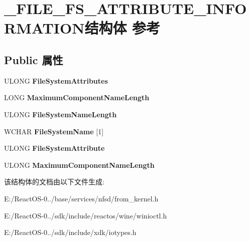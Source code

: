 \hypertarget{struct___f_i_l_e___f_s___a_t_t_r_i_b_u_t_e___i_n_f_o_r_m_a_t_i_o_n}{}\section{\+\_\+\+F\+I\+L\+E\+\_\+\+F\+S\+\_\+\+A\+T\+T\+R\+I\+B\+U\+T\+E\+\_\+\+I\+N\+F\+O\+R\+M\+A\+T\+I\+O\+N结构体 参考}
\label{struct___f_i_l_e___f_s___a_t_t_r_i_b_u_t_e___i_n_f_o_r_m_a_t_i_o_n}
\subsection*{Public 属性}
\begin{DoxyCompactItemize}
\item 
\mbox{\label{struct___f_i_l_e___f_s___a_t_t_r_i_b_u_t_e___i_n_f_o_r_m_a_t_i_o_n_a65e3219270d77ad5fa66ad0c03287800}} 
U\+L\+O\+NG {\bfseries File\+System\+Attributes}
\item 
\mbox{\label{struct___f_i_l_e___f_s___a_t_t_r_i_b_u_t_e___i_n_f_o_r_m_a_t_i_o_n_acaedbe8a0ba5fd34fd95955620f08716}} 
L\+O\+NG {\bfseries Maximum\+Component\+Name\+Length}
\item 
\mbox{\label{struct___f_i_l_e___f_s___a_t_t_r_i_b_u_t_e___i_n_f_o_r_m_a_t_i_o_n_a7f3cbfb7319eea246cdbed9174ceb298}} 
U\+L\+O\+NG {\bfseries File\+System\+Name\+Length}
\item 
\mbox{\label{struct___f_i_l_e___f_s___a_t_t_r_i_b_u_t_e___i_n_f_o_r_m_a_t_i_o_n_ac519495ef918b4e1bf71f4fbd1cc07b1}} 
W\+C\+H\+AR {\bfseries File\+System\+Name} \mbox{[}1\mbox{]}
\item 
\mbox{\label{struct___f_i_l_e___f_s___a_t_t_r_i_b_u_t_e___i_n_f_o_r_m_a_t_i_o_n_ab3726c62e2dfe7ab488faeda61eb230e}} 
U\+L\+O\+NG {\bfseries File\+System\+Attribute}
\item 
\mbox{\label{struct___f_i_l_e___f_s___a_t_t_r_i_b_u_t_e___i_n_f_o_r_m_a_t_i_o_n_a8609b1de1b8fc08773ad029825ad4272}} 
U\+L\+O\+NG {\bfseries Maximum\+Component\+Name\+Length}
\end{DoxyCompactItemize}


该结构体的文档由以下文件生成\+:\begin{DoxyCompactItemize}
\item 
E\+:/\+React\+O\+S-\/0../base/services/nfsd/from\+\_\+kernel.\+h\item 
E\+:/\+React\+O\+S-\/0../sdk/include/reactos/wine/winioctl.\+h\item 
E\+:/\+React\+O\+S-\/0../sdk/include/xdk/iotypes.\+h\end{DoxyCompactItemize}
